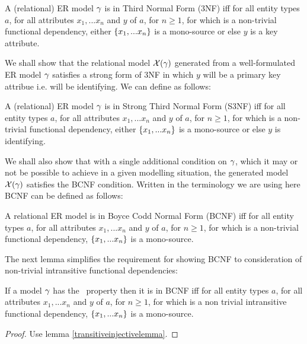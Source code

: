 \begin{definition} %
A (relational) ER model $\gamma$ is in  Third Normal Form (3NF)  iff
for all entity types $a$, for all attributes $x_1,...x_n$ and $y$ of $a$, for $n \geq 1$, 
for which   is a non-trivial functional dependency, 
either $\left\{x_1,...x_n\right\}$ is a mono-source or else $y$ is a key attribute.
\end{definition}


We shall show that the relational model $\mathcal{X}(\gamma)$ generated from a well-formulated 
ER model $\gamma$ satisfies a strong form of 3NF in which $y$ will be a primary key attribue i.e. will be identifying.
We can define as follows:

\begin{definition} %
A (relational) ER model $\gamma$ is in Strong Third Normal Form (S3NF)  iff
for all entity types $a$, for all attributes $x_1,...x_n$ and $y$ of $a$, for $n \geq 1$, 
for which   is a non-trivial functional dependency, 
either $\left\{x_1,...x_n\right\}$ is a mono-source or else $y$ is identifying.
\end{definition}

We shall also show that with a single additional condition on $\gamma$, which it may or not be possible to achieve in a given modelling situation,
the generated model $\mathcal{X}(\gamma)$ satisfies the BCNF condition.
Written in the terminology we are using here BCNF can be defined as follows:
\begin{definition} %
A relational ER model is in Boyce Codd Normal Form (BCNF)  iff
for all entity types $a$, for all attributes $x_1,...x_n$ and $y$ of $a$, for $n \geq 1$, 
for which   is a non-trivial functional dependency, 
$\left\{x_1,...x_n\right\}$ is a mono-source.  
\end{definition}

\noindent The next lemma simplifies the requirement for showing BCNF to consideration of non-trivial
intransitive functional dependencies:

\begin{lemma}
If a model $\gamma$ has the \fdfactoring\ property then it is in BCNF iff
for all entity types $a$, for all attributes $x_1,...x_n$ and $y$ of $a$, for $n \geq 1$, 
for which  is a non trivial  intransitive functional dependency,
$\left\{x_1,...x_n\right\}$ is a mono-source. 
\end{lemma}
\begin{proof}Use lemma \ref{transitiveinjectivelemma}.
\end{proof}

